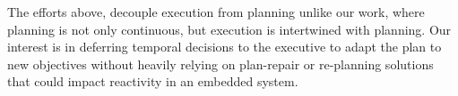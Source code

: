 The efforts above, decouple execution from planning unlike our work,
where planning is not only continuous, but execution is intertwined
with planning. Our interest is in deferring temporal decisions to the
executive to adapt the plan to new objectives without heavily relying
on plan-repair or re-planning solutions that could impact reactivity
in an embedded system. 




